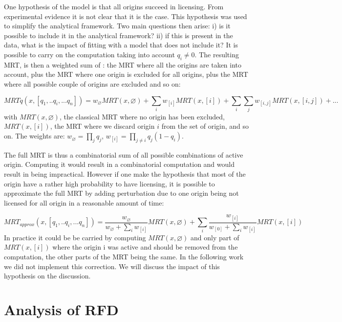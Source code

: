 \documentclass[10pt,a4paper]{revtex4-2}
\begin{document}
One hypothesis of the model is that all origins succeed in licensing. From experimental evidence it is not clear that it is the case. This hypothesis was used to simplify the analytical framework. Two main questions then arise: i) is it possible to include it in the analytical framework? ii) if this is present in the data, what is the impact of fitting with a model that does not include it? 
It is possible to carry on the computation taking into account $q_i \neq 0$. The resulting MRT, is then a weighted sum of : the MRT where all the origins are taken into account, plus the MRT where one origin is excluded for all origins, plus the MRT where all possible couple of origins are excluded and so on:

\begin{equation}
MRTq(x,[q_1,..q_i,...q_n]) = w_{\varnothing} MRT(x,\varnothing) +  \sum_i w_{[i]} MRT(x,[i]) +  \sum_i\sum_j w_{[i,j]} MRT(x,[i,j]) + ...
\end{equation}
with $MRT(x,\varnothing)$, the classical MRT  where no origin has been excluded, $MRT(x,[i])$, the MRT where we discard origin $i$ from the set of origin, and so on.
The weights are: $w_{\varnothing} = \prod_j q_j$,  $w_{[i]} = \prod_{j\neq i} q_j (1-q_i) $.

The full MRT is thus a combinatorial sum of all possible combinations of active origin.
Computing it would result in a combinatorial computation and would result in being impractical. However if one make the hypothesis that most of the origin have a rather high probability to have licensing, it is possible to approximate the full MRT by
 adding perturbation due to one origin being not licensed for all origin in a reasonable amount of time:

\begin{equation}
MRT_{approx}(x,[q_1,..q_i,...q_n]) = \frac{w_{\varnothing}}{w_{\varnothing}+\sum_i w_{[i]}} MRT(x,\varnothing) +  \sum_i \frac{w_{[i]}}{w_{[0]}+\sum_i w_{[i]}} MRT(x,[i])
\end{equation}
In practice it could be be carried by computing $MRT(x,\varnothing)$ and only part of  $MRT(x,[i])$ where the origin i was active and should be removed from the computation, the other parts of the MRT being the same. In the following work we did not implement this correction. We will discuss the impact of this hypothesis on the discussion.


\section{Analysis of RFD}
\end{document}
